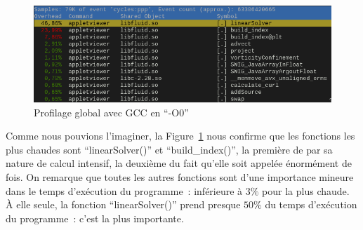 \documentclass[12pt,a4paper]{article}
\begin{document}
\begin{figure}[h]
    \centering
    \includegraphics[scale=0.62]{figures/optims/gcc-O0/global.png}
    \caption{Profilage global avec \ac{GCC} en \enquote{-O0}}
    \label{fig.optim.global}
\end{figure}

Comme nous pouvions l'imaginer, la Figure~\ref{fig.optim.global} nous confirme
que les fonctions les plus chaudes sont \enquote{linearSolver()} et
\enquote{build\_index()}, la première de par sa nature de calcul intensif, la
deuxième du fait qu'elle soit appelée énormément de fois. On remarque que toutes
les autres fonctions sont d'une importance mineure dans le temps d'exécution du
programme : inférieure à $3\%$ pour la plus chaude. À elle seule, la fonction
\enquote{linearSolver()} prend presque $50\%$ du temps d'exécution du
programme : c'est la plus importante.
\end{document}
